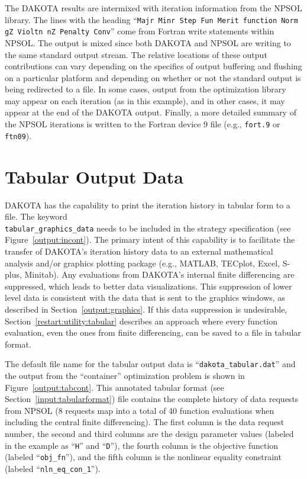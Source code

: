 The DAKOTA results are intermixed with iteration information from the
NPSOL library. The lines with the heading ``\texttt{Majr Minr Step Fun
  Merit function Norm gZ Violtn nZ Penalty Conv}'' come from Fortran
write statements within NPSOL. The output is mixed since both DAKOTA
and NPSOL are writing to the same standard output stream. The relative
locations of these output contributions can vary depending on the
specifics of output buffering and flushing on a particular platform
and depending on whether or not the standard output is being
redirected to a file. In some cases, output from the optimization
library may appear on each iteration (as in this example), and in
other cases, it may appear at the end of the DAKOTA output. Finally, a
more detailed summary of the NPSOL iterations is written to the
Fortran device 9 file (e.g., \texttt{fort.9} or \texttt{ftn09}).

\section{Tabular Output Data}\label{output:tabular}

DAKOTA has the capability to print the iteration history in tabular
form to a file. The keyword\\
\texttt{tabular\_graphics\_data} needs to be included in the strategy 
specification (see Figure~\ref{output:incont}). The primary intent
of this capability is to facilitate the transfer of DAKOTA's iteration
history data to an external mathematical analysis and/or graphics
plotting package (e.g., MATLAB, TECplot, Excel, S-plus, Minitab). Any
evaluations from DAKOTA's internal finite differencing are suppressed,
which leads to better data visualizations. This suppression of lower
level data is consistent with the data that is sent to the graphics
windows, as described in Section~\ref{output:graphics}. If this data
suppression is undesirable, Section~\ref{restart:utility:tabular}
describes an approach where every function evaluation, even the ones
from finite differencing, can be saved to a file in tabular format.

The default file name for the tabular output data is
``\texttt{dakota\_tabular.dat}'' and the output from the ``container''
optimization problem is shown in Figure~\ref{output:tabcont}. This
annotated tabular format (see Section~\ref{input:tabularformat}) file
contains the complete history of data requests from NPSOL (8 requests
map into a total of 40 function evaluations when including the central
finite differencing). The first column is the data request number, the
second and third columns are the design parameter values (labeled in
the example as ``\texttt{H}'' and ``\texttt{D}''), the fourth column
is the objective function (labeled ``\texttt{obj\_fn}''), and the
fifth column is the nonlinear equality constraint (labeled
``\texttt{nln\_eq\_con\_1}'').


